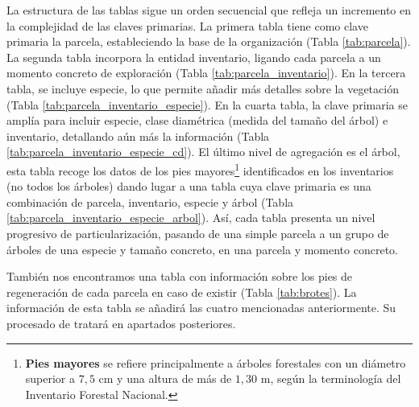 \medskip

La estructura de las tablas sigue un orden secuencial que refleja un incremento en la complejidad de las claves primarias. La primera tabla tiene como clave primaria la parcela, estableciendo la base de la organización (Tabla \ref{tab:parcela}). La segunda tabla incorpora la entidad inventario, ligando cada parcela a un momento concreto de exploración (Tabla \ref{tab:parcela_inventario}). En la tercera tabla, se incluye especie, lo que permite añadir más detalles sobre la vegetación (Tabla \ref{tab:parcela_inventario_especie}). En la cuarta tabla, la clave primaria se amplía para incluir especie, clase diamétrica (medida del tamaño del árbol) e inventario, detallando aún más la información (Tabla \ref{tab:parcela_inventario_especie_cd}). El último nivel de agregación es el árbol, esta tabla recoge los datos de los pies mayores\footnote{\textbf{Pies mayores} se refiere principalmente a árboles forestales con un diámetro superior a \(7,5\) cm y una altura de más de \(1,30\) m, según la terminología del Inventario Forestal Nacional.} identificados en los inventarios (no todos los árboles) dando lugar a una tabla cuya clave primaria es una combinación de parcela, inventario, especie y árbol (Tabla \ref{tab:parcela_inventario_especie_arbol}). Así, cada tabla presenta un nivel progresivo de particularización, pasando de una simple parcela a un grupo de árboles de una especie y tamaño concreto, en una parcela y momento concreto.

También nos encontramos una tabla con información sobre los pies de regeneración de cada parcela en caso de existir (Tabla \ref{tab:brotes}). La información de esta tabla se añadirá las cuatro mencionadas anteriormente. Su procesado de tratará en apartados posteriores.

